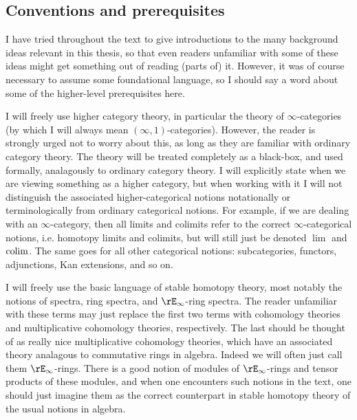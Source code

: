 
\subsection{Conventions and prerequisites}
\label{intro-conventions}

I have tried throughout the text to give introductions to the many
background ideas relevant in this thesis, so that even readers
unfamiliar with some of these ideas might get something out of reading
(parts of) it. However, it was of course necessary to assume some
foundational language, so I should say a word about some of the
higher-level prerequisites here.

I will freely use higher category theory, in particular the theory of
$\infty$-categories (by which I will always mean
$(\infty,1)$-categories). However, the reader is strongly urged not to
worry about this, as long as they are familiar with ordinary category
theory. The theory will be treated completely as a black-box, and used
formally, analagously to ordinary category theory. I will explicitly
state when we are viewing something as a higher category, but when
working with it I will not distinguish the associated
higher-categorical notions notationally or terminologically from
ordinary categorical notions. For example, if we are dealing with an
$\infty$-category, then all limits and colimits refer to the correct
$\infty$-categorical notions, i.e. homotopy limits and colimits, but
will still just be denoted $\lim$ and $\operatorname*{colim}$. The same goes for all
other categorical notions: subcategories, functors, adjunctions, Kan
extensions, and so on.

I will freely use the basic language of stable homotopy theory, most
notably the notions of spectra, ring spectra, and $\rE_\infty$-ring
spectra. The reader unfamiliar with these terms may just replace the
first two terms with cohomology theories and multiplicative cohomology
theories, respectively. The last should be thought of as really nice
multiplicative cohomology theories, which have an associated theory
analagous to commutative rings in algebra. Indeed we will often just
call them $\rE_\infty$-rings. There is a good notion of modules of
$\rE_\infty$-rings and tensor products of these modules, and when one
encounters such notions in the text, one should just imagine them as
the correct counterpart in stable homotopy theory of the usual notions
in algebra.

